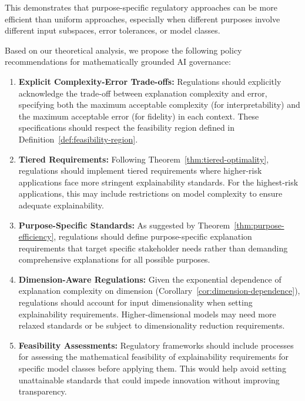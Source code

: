 \documentclass[11pt,letter,leqno]{article}
\begin{document}
This demonstrates that purpose-specific regulatory approaches can be more efficient than uniform approaches, especially when different purposes involve different input subspaces, error tolerances, or model classes.

Based on our theoretical analysis, we propose the following policy recommendations for mathematically grounded AI governance:

\begin{enumerate}

\item \textbf{Explicit Complexity-Error Trade-offs:} Regulations should explicitly acknowledge the trade-off between explanation complexity and error, specifying both the maximum acceptable complexity (for interpretability) and the maximum acceptable error (for fidelity) in each context.  These specifications should respect the feasibility region defined in Definition~\ref{def:feasibility-region}.

\item \textbf{Tiered Requirements:} Following Theorem~\ref{thm:tiered-optimality}, regulations should implement tiered requirements where higher-risk applications face more stringent explainability standards.  For the highest-risk applications, this may include restrictions on model complexity to ensure adequate explainability.

\item \textbf{Purpose-Specific Standards:} As suggested by Theorem~\ref{thm:purpose-efficiency}, regulations should define purpose-specific explanation requirements that target specific stakeholder needs rather than demanding comprehensive explanations for all possible purposes.

\item \textbf{Dimension-Aware Regulations:} Given the exponential dependence of explanation complexity on dimension (Corollary~\ref{cor:dimension-dependence}), regulations should account for input dimensionality when setting explainability requirements.  Higher-dimensional models may need more relaxed standards or be subject to dimensionality reduction requirements.

\item \textbf{Feasibility Assessments:} Regulatory frameworks should include processes for assessing the mathematical feasibility of explainability requirements for specific model classes before applying them.  This would help avoid setting unattainable standards that could impede innovation without improving transparency.

\end{enumerate}
\end{document}
